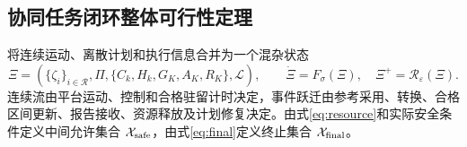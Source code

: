 \documentclass[UTF8,fontset=fandol,a4paper,11pt]{ctexart}
\begin{document}
\subsection{协同任务闭环整体可行性定理}

将连续运动、离散计划和执行信息合并为一个混杂状态
\begin{equation}
 \Xi=(\{\zeta_i\}_{i\in\mathcal R},\Pi,\{C_k,H_k,G_K,A_K,R_K\},
                 \mathcal L),\qquad
 \dot\Xi=F_\sigma(\Xi),\quad
 \Xi^+=\mathcal R_{\varepsilon}(\Xi).
 \label{eq:unifiedstate}
\end{equation}
连续流由平台运动、控制和合格驻留计时决定，事件跃迁由参考采用、转换、合格区间更新、报告接收、资源释放及计划修复决定。由式\eqref{eq:resource}和实际安全条件定义中间允许集合 $\mathcal X_{\rm safe}$，由式\eqref{eq:final}定义终止集合 $\mathcal X_{\rm final}$。
\end{document}
